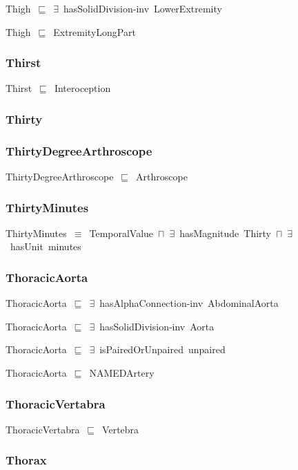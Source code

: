 \documentclass{article}
\begin{document}
Thigh~\ensuremath{\sqsubseteq}~\ensuremath{\exists}~hasSolidDivision-inv~LowerExtremity~

Thigh~\ensuremath{\sqsubseteq}~ExtremityLongPart~

\subsubsection*{Thirst}

Thirst~\ensuremath{\sqsubseteq}~Interoception~

\subsubsection*{Thirty}

\subsubsection*{ThirtyDegreeArthroscope}

ThirtyDegreeArthroscope~\ensuremath{\sqsubseteq}~Arthroscope~

\subsubsection*{ThirtyMinutes}

ThirtyMinutes~\ensuremath{\equiv}~TemporalValue~\ensuremath{\sqcap}~\ensuremath{\exists}~hasMagnitude~Thirty~\ensuremath{\sqcap}~\ensuremath{\exists}~hasUnit~minutes

\subsubsection*{ThoracicAorta}

ThoracicAorta~\ensuremath{\sqsubseteq}~\ensuremath{\exists}~hasAlphaConnection-inv~AbdominalAorta~

ThoracicAorta~\ensuremath{\sqsubseteq}~\ensuremath{\exists}~hasSolidDivision-inv~Aorta~

ThoracicAorta~\ensuremath{\sqsubseteq}~\ensuremath{\exists}~isPairedOrUnpaired~unpaired~

ThoracicAorta~\ensuremath{\sqsubseteq}~NAMEDArtery~

\subsubsection*{ThoracicVertabra}

ThoracicVertabra~\ensuremath{\sqsubseteq}~Vertebra~

\subsubsection*{Thorax}
\end{document}
